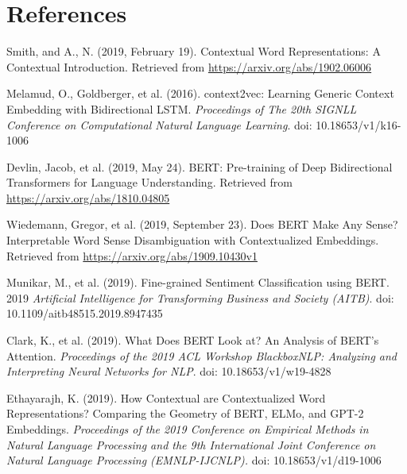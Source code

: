 \section*{References}\label{sec:References}

\vspace{10pt}

\begin{enumerateSpaced}{4pt}

    \item Smith, and A., N. (2019, February 19). Contextual Word Representations: A Contextual Introduction. Retrieved from \url{https://arxiv.org/abs/1902.06006}

    \item Melamud, O., Goldberger, et al. (2016). context2vec: Learning Generic Context Embedding with Bidirectional LSTM. \emph{Proceedings of The 20th SIGNLL Conference on Computational Natural Language Learning}. doi: 10.18653/v1/k16-1006
    
    \item Devlin, Jacob, et al. (2019, May 24). BERT: Pre-training of Deep Bidirectional Transformers for Language Understanding. Retrieved from \url{https://arxiv.org/abs/1810.04805}
    
    \item Wiedemann, Gregor, et al. (2019, September 23). Does BERT Make Any Sense? Interpretable Word Sense Disambiguation with Contextualized Embeddings. Retrieved from \url{https://arxiv.org/abs/1909.10430v1}
    
    \item Munikar, M., et al. (2019). Fine-grained Sentiment Classification using BERT. 2019 \emph{Artificial Intelligence for Transforming Business and Society (AITB)}. doi: 10.1109/aitb48515.2019.8947435
    
    \item Clark, K., et al. (2019). What Does BERT Look at? An Analysis of BERT’s Attention. \emph{Proceedings of the 2019 ACL Workshop BlackboxNLP: Analyzing and Interpreting Neural Networks for NLP}. doi: 10.18653/v1/w19-4828
    
    \item Ethayarajh, K. (2019). How Contextual are Contextualized Word Representations? Comparing the Geometry of BERT, ELMo, and GPT-2 Embeddings. \emph{Proceedings of the 2019 Conference on Empirical Methods in Natural Language Processing and the 9th International Joint Conference on Natural Language Processing (EMNLP-IJCNLP).} doi: 10.18653/v1/d19-1006


\end{enumerateSpaced}
